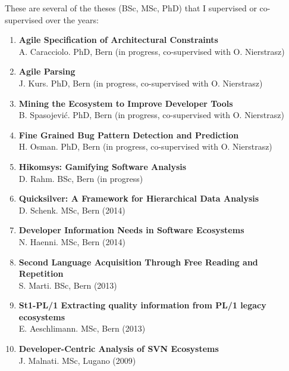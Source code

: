 
\newcommand{\super}[5]{\item {\bf #2}\\ #1. #3, #4 #5}
\newcommand{\inprogr}{{\footnotesize(in progress)}}
\newcommand{\inprogrcosup}{{\footnotesize(in progress, co-supervised with O. Nierstrasz)}}

\newcommand{\yr}[1]{(#1)}

These are several of the theses (BSc, MSc, PhD) that I supervised or co-supervised over the years:

\begin{enumerate}

\super 
	{A. Caracciolo}
	{Agile Specification of Architectural Constraints}
	{PhD}
	{Bern}
	{\inprogrcosup}

\super 
	{J. Kurs}
	{Agile Parsing}
	{PhD}
	{Bern}
	{\inprogrcosup}	

\super 
	{B. Spasojevi\'{c}}
	{Mining the Ecosystem to Improve Developer Tools}
	{PhD}
	{Bern}
	{\inprogrcosup}

\super 
	{H. Osman}
	{Fine Grained Bug Pattern Detection and Prediction}
	{PhD}
	{Bern}
	{\inprogrcosup}	



\super 
	{D. Rahm}
	{Hikomsys: Gamifying Software Analysis}
	{BSc}
	{Bern}
	{\inprogr}


\super 
	{D. Schenk}
	{Quicksilver: A Framework for Hierarchical Data Analysis}
	{MSc}
	{Bern}
	{\yr{2014}}

\super 
	{N. Haenni}
	{Developer Information Needs in Software Ecosystems}
	{MSc}
	{Bern}
	{\yr{2014}}

\super 
	{S. Marti}
	{Second Language Acquisition Through Free Reading and Repetition}
	{BSc}
	{Bern}
	{\yr{2013}}

\super 
	{E. Aeschlimann}
	{St1-PL/1
Extracting quality information from PL/1 legacy ecosystems}
	{MSc}
	{Bern}
	{\yr{2013}}



\super 
	{J. Malnati}
	{Developer-Centric Analysis of SVN Ecosystems}
	{MSc}
	{Lugano}
	{\yr{2009}}



\end{enumerate}